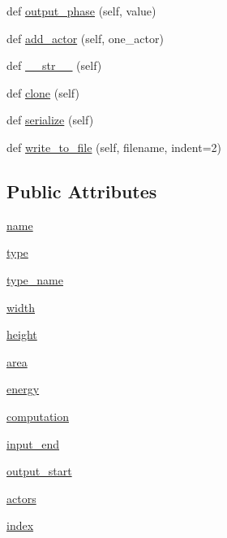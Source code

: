 \begin{DoxyCompactItemize}
\item 
def \hyperlink{classsylva_1_1base_1_1fimp_1_1fimp_a40756aeb1892d118aa4649c5f6251970}{output\+\_\+phase} (self, value)
\item 
def \hyperlink{classsylva_1_1base_1_1fimp_1_1fimp_aae44656de7647ed6e62eaaec05022b42}{add\+\_\+actor} (self, one\+\_\+actor)
\item 
def \hyperlink{classsylva_1_1base_1_1fimp_1_1fimp_a0b3095642fa1f513c3efa52dc5780d6c}{\+\_\+\+\_\+str\+\_\+\+\_\+} (self)
\item 
def \hyperlink{classsylva_1_1base_1_1fimp_1_1fimp_a3a158e5ef136d9a8bf4a8d2e14f7b042}{clone} (self)
\item 
def \hyperlink{classsylva_1_1base_1_1fimp_1_1fimp_a1b1f25751dbb9d953496580d5c9b876d}{serialize} (self)
\item 
def \hyperlink{classsylva_1_1base_1_1fimp_1_1fimp_adbad0036657c94fba81656b44e134658}{write\+\_\+to\+\_\+file} (self, filename, indent=2)
\end{DoxyCompactItemize}
\subsection*{Public Attributes}
\begin{DoxyCompactItemize}
\item 
\hyperlink{classsylva_1_1base_1_1fimp_1_1fimp_a29c118ec372fd4475356ec690b878e32}{name}
\item 
\hyperlink{classsylva_1_1base_1_1fimp_1_1fimp_a2a0ef56805a0a4b151421c183d7b78ca}{type}
\item 
\hyperlink{classsylva_1_1base_1_1fimp_1_1fimp_a0eb962cbafd47c9f28ad2859d6a64de2}{type\+\_\+name}
\item 
\hyperlink{classsylva_1_1base_1_1fimp_1_1fimp_af63a637b7584ab0fcd1a7702e9ee9003}{width}
\item 
\hyperlink{classsylva_1_1base_1_1fimp_1_1fimp_a78a56a561ea60125f7d26416f0ed3130}{height}
\item 
\hyperlink{classsylva_1_1base_1_1fimp_1_1fimp_aba97f75ec38d4e542e7a7f5ed08056f4}{area}
\item 
\hyperlink{classsylva_1_1base_1_1fimp_1_1fimp_a70e3d3e9ddf525857936814218df1b4b}{energy}
\item 
\hyperlink{classsylva_1_1base_1_1fimp_1_1fimp_aa96a232d193bcdf9f2048d4d346f906e}{computation}
\item 
\hyperlink{classsylva_1_1base_1_1fimp_1_1fimp_a892008b42d5b1ba9f52a52d89fc252fa}{input\+\_\+end}
\item 
\hyperlink{classsylva_1_1base_1_1fimp_1_1fimp_a2782f46c3a7713c9c9d7ff5be05615a8}{output\+\_\+start}
\item 
\hyperlink{classsylva_1_1base_1_1fimp_1_1fimp_af3b0060134dd494b1e24e91f6c7530e2}{actors}
\item 
\hyperlink{classsylva_1_1base_1_1fimp_1_1fimp_a21147e520263c3af6d9ca04a4043f81c}{index}
\end{DoxyCompactItemize}
